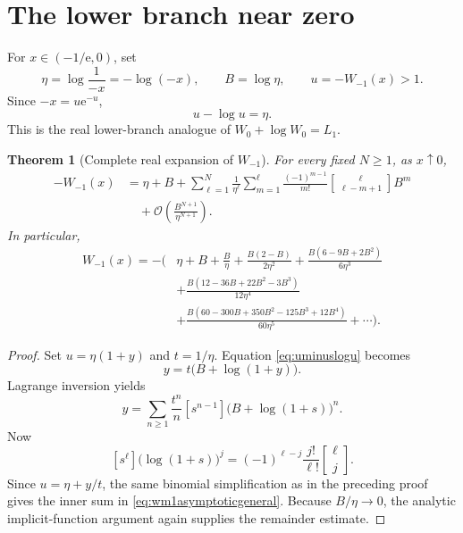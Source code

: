 \documentclass[11pt,oneside]{book}
\newtheorem{theorem}{Theorem}[chapter]
\theoremstyle{definition}
\theoremstyle{remark}
\newcommand{\ee}{\mathrm e}
\newcommand{\bigO}{\mathcal O}
\newcommand{\stirlingone}[2]{\genfrac{[}{]}{0pt}{}{#1}{#2}}
\begin{document}
\section{The lower branch near zero}

For $x\in(-1/\ee,0)$, set
\begin{equation}\label{eq:etaB}
 \eta=\log\frac1{-x}=-\log(-x),
 \qquad B=\log\eta,
 \qquad u=-W_{-1}(x)>1.
\end{equation}
Since $-x=u\ee^{-u}$,
\begin{equation}\label{eq:uminuslogu}
 u-\log u=\eta.
\end{equation}
This is the real lower-branch analogue of $W_0+\log W_0=L_1$.

\begin{theorem}[Complete real expansion of $W_{-1}$]\label{thm:wm1asymptotic}
For every fixed $N\ge1$, as $x\uparrow0$,
\begin{align}
 -W_{-1}(x)
 &=\eta+B
 +\sum_{\ell=1}^{N}\frac1{\eta^\ell}
   \sum_{m=1}^{\ell}
   \frac{(-1)^{m-1}}{m!}
   \stirlingone{\ell}{\ell-m+1}B^m
 \nonumber\\
 &\quad+\bigO\!\left(\frac{B^{N+1}}{\eta^{N+1}}\right).
 \label{eq:wm1asymptoticgeneral}
\end{align}
In particular,
\begin{align}
 W_{-1}(x)=-\Bigg(&\eta+B+\frac{B}{\eta}
 +\frac{B(2-B)}{2\eta^2}
 +\frac{B(6-9B+2B^2)}{6\eta^3}\nonumber\\
 &+\frac{B(12-36B+22B^2-3B^3)}{12\eta^4}\nonumber\\
 &+\frac{B(60-300B+350B^2-125B^3+12B^4)}{60\eta^5}
 +\cdots\Bigg).
 \label{eq:wm1asymptoticexplicit}
\end{align}
\end{theorem}

\begin{proof}
Set $u=\eta(1+y)$ and $t=1/\eta$.  Equation
\eqref{eq:uminuslogu} becomes
\begin{equation}\label{eq:ylower}
 y=t\bigl(B+\log(1+y)\bigr).
\end{equation}
Lagrange inversion yields
\[
 y=\sum_{n\ge1}\frac{t^n}{n}
 [s^{n-1}]\bigl(B+\log(1+s)\bigr)^n.
\]
Now
\[
 [s^\ell]\bigl(\log(1+s)\bigr)^j
 =(-1)^{\ell-j}\frac{j!}{\ell!}
 \stirlingone{\ell}{j}.
\]
Since $u=\eta+y/t$, the same binomial simplification as in the preceding
proof gives the inner sum in \eqref{eq:wm1asymptoticgeneral}.  Because
$B/\eta\to0$, the analytic implicit-function argument again supplies the
remainder estimate.
\end{proof}
\end{document}
